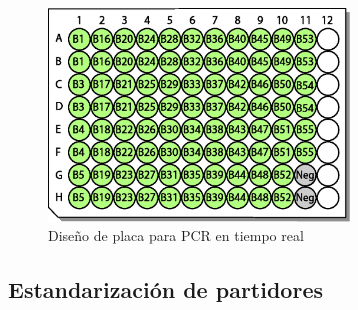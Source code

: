 \documentclass[12pt,letterpaper,oneside]{scrbook}
\begin{document}
\begin{figure}[h!]
    \centering
    \includegraphics[width=8cm]{placaqpcr}
    \caption {Diseño de placa para PCR en tiempo real}
    \label {fig:placapcr}
\end{figure}

\subsection{Estandarización de partidores}
\end{document}
